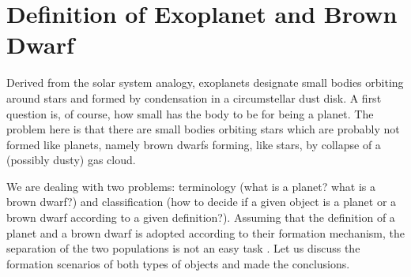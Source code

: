 \section{Definition of Exoplanet and Brown Dwarf}
Derived from the solar system analogy, exoplanets designate small bodies orbiting around
stars and formed by condensation in a circumstellar dust disk. 
A first question is, of course, how small has the body to be for being a planet. 
The problem here is that there are small bodies orbiting stars which are probably not formed
like planets, namely brown dwarfs forming, like stars, by collapse of a (possibly dusty) gas cloud.


We are dealing with two problems: terminology (what is a planet? what is a brown dwarf?) and classification
(how to decide if a given object is a planet or a brown dwarf according to a given definition?). 
Assuming that the definition of a planet and a brown dwarf is adopted according to their formation mechanism, the separation 
of the two populations is not an easy task \citep{COROT_book}.
Let us discuss the formation scenarios of both types of objects and made the conclusions.


